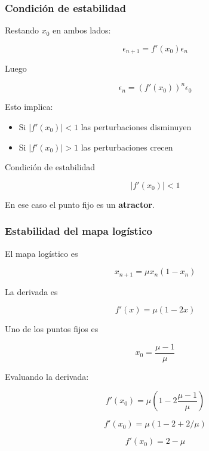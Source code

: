 \begin{frame}
\frametitle{Condición de estabilidad}

Restando $x_0$ en ambos lados:

\[
\epsilon_{n+1}=f'(x_0)\epsilon_n
\]

Luego

\[
\epsilon_n = (f'(x_0))^n \epsilon_0
\]

Esto implica:

\begin{itemize}
\item Si $|f'(x_0)|<1$ las perturbaciones disminuyen
\item Si $|f'(x_0)|>1$ las perturbaciones crecen
\end{itemize}

\begin{block}{Condición de estabilidad}

\[
|f'(x_0)| < 1
\]

\end{block}

En ese caso el punto fijo es un \textbf{atractor}.

\end{frame}



\begin{frame}
\frametitle{Estabilidad del mapa logístico}

El mapa logístico es

\[
x_{n+1}=\mu x_n(1-x_n)
\]

La derivada es

\[
f'(x)=\mu(1-2x)
\]

Uno de los puntos fijos es

\[
x_0=\frac{\mu-1}{\mu}
\]

Evaluando la derivada:

\[
f'(x_0)=\mu\left(1-2\frac{\mu-1}{\mu}\right)
\]

\[
f'(x_0)=\mu(1-2+2/\mu)
\]

\[
f'(x_0)=2-\mu
\]

\end{frame}


